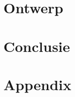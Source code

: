 \part{Ontwerp}\label{prt:ontwerp}







\part{Conclusie}\label{prt:conclusie}





\cleardoublepage %


\appendix

\part{Appendix} %











